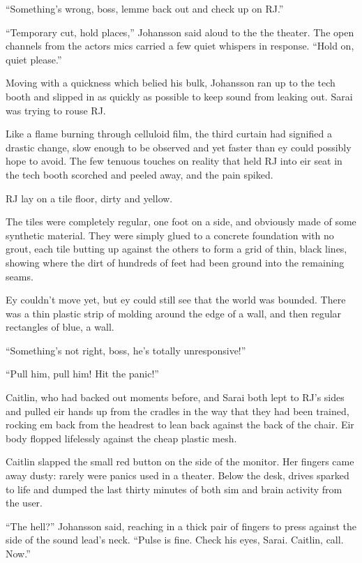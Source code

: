 ``Something's wrong, boss, lemme back out and check up on RJ.''

``Temporary cut, hold places,'' Johansson said aloud to the the theater. The open channels from the actors mics carried a few quiet whispers in response. ``Hold on, quiet please.''

Moving with a quickness which belied his bulk, Johansson ran up to the tech booth and slipped in as quickly as possible to keep sound from leaking out. Sarai was trying to rouse RJ.

\secdiv

Like a flame burning through celluloid film, the third curtain had signified a drastic change, slow enough to be observed and yet faster than ey could possibly hope to avoid. The few tenuous touches on reality that held RJ into eir seat in the tech booth scorched and peeled away, and the pain spiked.

RJ lay on a tile floor, dirty and yellow.

The tiles were completely regular, one foot on a side, and obviously made of some synthetic material. They were simply glued to a concrete foundation with no grout, each tile butting up against the others to form a grid of thin, black lines, showing where the dirt of hundreds of feet had been ground into the remaining seams.

Ey couldn't move yet, but ey could still see that the world was bounded. There was a thin plastic strip of molding around the edge of a wall, and then regular rectangles of blue, a wall.

\secdiv

``Something's not right, boss, he's totally unresponsive!''

``Pull him, pull him! Hit the panic!''

Caitlin, who had backed out moments before, and Sarai both lept to RJ's sides and pulled eir hands up from the cradles in the way that they had been trained, rocking em back from the headrest to lean back against the back of the chair. Eir body flopped lifelessly against the cheap plastic mesh.

Caitlin slapped the small red button on the side of the monitor. Her fingers came away dusty: rarely were panics used in a theater. Below the desk, drives sparked to life and dumped the last thirty minutes of both sim and brain activity from the user.

``The hell?'' Johansson said, reaching in a thick pair of fingers to press against the side of the sound lead's neck. ``Pulse is fine. Check his eyes, Sarai. Caitlin, call. Now.''

